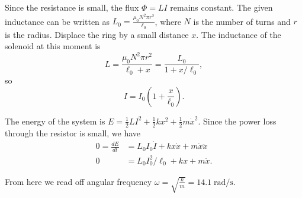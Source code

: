 \begin{solution}

Since the resistance is small, the flux $\Phi=LI$ remains constant. The given inductance can be written as $L_0=\frac{\mu_0 N^2 \pi r^2}{\ell_0}$, where $N$ is the number of turns and $r$ is the radius. Displace the ring by a small distance $x$. The inductance of the solenoid at this moment is $$L=\frac{\mu_0 N^2\pi r^2}{\ell_0+x}=\frac{L_0}{1+x/\ell_0},$$ so $$I=I_0(1+\frac{x}{\ell_0}).$$

The energy of the system is $E=\frac12 LI^2 + \frac12 kx^2 + \frac12 m\dot{x}^2$. Since the power loss through the resistor is small, we have
\begin{align*}
    0=\frac{dE}{dt} &= L_0I_0\dot{I} + kx\dot{x} + m\dot{x}\ddot{x} \\
    0 &= L_0I_0^2/\ell_0 + kx + m\ddot{x}.
\end{align*}

From here we read off angular frequency $\omega=\sqrt{\frac{k}{m}}=\boxed{14.1\;\mathrm{rad/s}}.$

\end{solution}